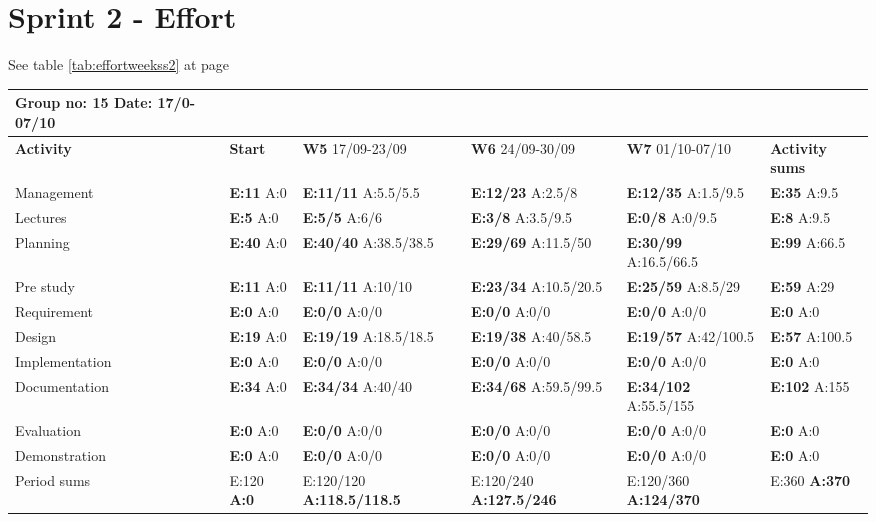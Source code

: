 \pagebreak
\section{Sprint 2 - Effort}

See table \ref{tab:effortweekss2} at page \pageref{tab:effortweekss2}
\begin{table}
\begin{tabularx}{\linewidth}{>{\setlength\hsize{.625\hsize}}X|>{\setlength\hsize{0.3\hsize}}X|>{\setlength\hsize{0.5\hsize}}X|>{\setlength\hsize{0.5\hsize}}X|>{\setlength\hsize{0.5\hsize}}X|>{\setlength\hsize{.3\hsize}}X}
Group no: 15 Date: 17/0-07/10  \\ \hline
\textbf{Activity} & \textbf{Start} & \textbf{W5} 17/09-23/09 & \textbf{W6} 24/09-30/09 & \textbf{W7} 01/10-07/10 & \textbf{Activity sums} \\ \hline \hline
Management & \textbf{E:11} A:0 & \textbf{E:11/11} A:5.5/5.5 & \textbf{E:12/23} A:2.5/8 & \textbf{E:12/35} A:1.5/9.5 & \textbf{E:35} A:9.5  \\ \hline
Lectures & \textbf{E:5} A:0 & \textbf{E:5/5} A:6/6 & \textbf{E:3/8} A:3.5/9.5 & \textbf{E:0/8} A:0/9.5 & \textbf{E:8 } A:9.5  \\ \hline
Planning & \textbf{E:40} A:0 & \textbf{E:40/40} A:38.5/38.5 & \textbf{E:29/69} A:11.5/50 & \textbf{E:30/99} A:16.5/66.5 & \textbf{E:99 } A:66.5  \\ \hline
Pre study & \textbf{E:11} A:0 & \textbf{E:11/11} A:10/10 & \textbf{E:23/34} A:10.5/20.5 & \textbf{E:25/59} A:8.5/29 & \textbf{E:59} A:29  \\ \hline
Requirement & \textbf{E:0} A:0 & \textbf{E:0/0} A:0/0 & \textbf{E:0/0} A:0/0 & \textbf{E:0/0} A:0/0 & \textbf{E:0} A:0  \\ \hline
Design & \textbf{E:19} A:0 & \textbf{E:19/19} A:18.5/18.5 & \textbf{E:19/38} A:40/58.5 & \textbf{E:19/57} A:42/100.5 & \textbf{E:57} A:100.5  \\ \hline
Implementation & \textbf{E:0} A:0 & \textbf{E:0/0} A:0/0 & \textbf{E:0/0} A:0/0 & \textbf{E:0/0} A:0/0 & \textbf{E:0} A:0  \\ \hline
Documentation & \textbf{E:34} A:0 & \textbf{E:34/34} A:40/40 & \textbf{E:34/68} A:59.5/99.5 & \textbf{E:34/102} A:55.5/155 & \textbf{E:102 } A:155  \\ \hline
Evaluation & \textbf{E:0} A:0 & \textbf{E:0/0} A:0/0 & \textbf{E:0/0} A:0/0 & \textbf{E:0/0} A:0/0 & \textbf{E:0 } A:0  \\ \hline
Demonstration & \textbf{E:0} A:0 & \textbf{E:0/0} A:0/0 & \textbf{E:0/0} A:0/0 & \textbf{E:0/0} A:0/0 & \textbf{E:0 } A:0  \\ \hline
Period sums & E:120 \textbf{A:0} & E:120/120 \textbf{A:118.5/118.5} & E:120/240 \textbf{A:127.5/246} & E:120/360 \textbf{A:124/370} & E:360 \textbf{A:370} \\ \hline
\end{tabularx}


\end{table}
